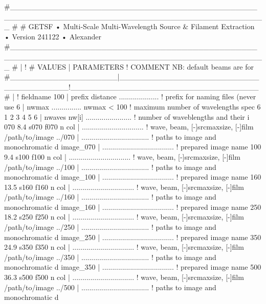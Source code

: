 \documentclass[a4paper,10pt]{article}
\begin{document}
\begin{verbnobox}[\mbox{}\small]
#_______________________________________________________________________________________________
#                                                                                               
# GETSF • Multi-Scale Multi-Wavelength Source & Filament Extraction • Version 241122 • Alexander
#_______________________________________________________________________________________________
#                    |                                      !
# VALUES             | PARAMETERS                           ! COMMENT  NB: default beams are for
#____________________|______________________________________!___________________________________
#                    |                                      !
 fieldname 100       | prefix distance .................... ! prefix for naming files (never use
 6                   | nwmax ...............{ nwmax < 100 } ! maximum number of wavelengths spec
 6 1 2 3 4 5 6       | nwaves nw[i] ....................... ! number of waveblengths and their i
 070  8.4 s070 f070 n col | ............................... ! wave, beam, [-]srcmaxsize, [-]film
 /path/to/image ../070 | .................................. ! paths to image and monochromatic d
 image_070           | .................................... ! prepared image name
 100  9.4 s100 f100 n col | ............................... ! wave, beam, [-]srcmaxsize, [-]film
 /path/to/image ../100 | .................................. ! paths to image and monochromatic d
 image_100           | .................................... ! prepared image name
 160 13.5 s160 f160 n col | ............................... ! wave, beam, [-]srcmaxsize, [-]film
 /path/to/image ../160 | .................................. ! paths to image and monochromatic d
 image_160           | .................................... ! prepared image name
 250 18.2 s250 f250 n col | ............................... ! wave, beam, [-]srcmaxsize, [-]film
 /path/to/image ../250 | .................................. ! paths to image and monochromatic d
 image_250           | .................................... ! prepared image name
 350 24.9 s350 f350 n col | ............................... ! wave, beam, [-]srcmaxsize, [-]film
 /path/to/image ../350 | .................................. ! paths to image and monochromatic d
 image_350           | .................................... ! prepared image name
 500 36.3 s500 f500 n col | ............................... ! wave, beam, [-]srcmaxsize, [-]film
 /path/to/image ../500 | .................................. ! paths to image and monochromatic d

\end{verbnobox}
\end{document}
